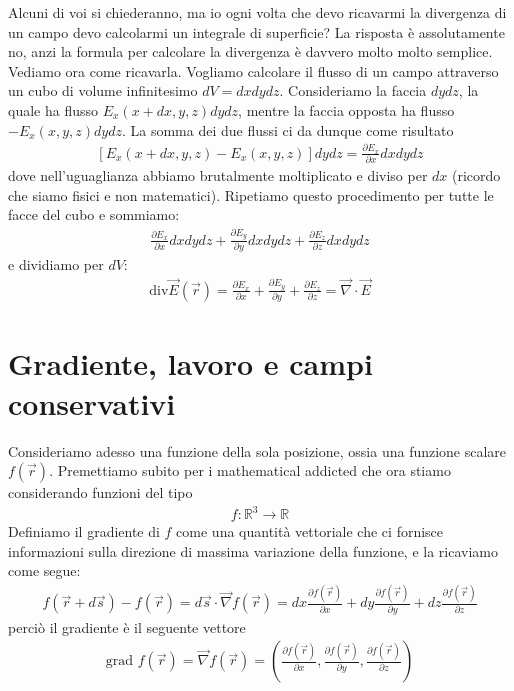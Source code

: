 \documentclass{book}
\begin{document}
Alcuni di voi si chiederanno, ma io ogni volta che devo ricavarmi la divergenza di un campo devo calcolarmi un integrale di superficie? La risposta è assolutamente no, anzi la formula per calcolare la divergenza è davvero molto molto semplice. Vediamo ora come ricavarla.
Vogliamo calcolare il flusso di un campo attraverso un cubo di volume infinitesimo $dV =dxdydz$.
Consideriamo la faccia $dydz$, la quale ha flusso $E_x(x+dx, y, z) dydz$, mentre la faccia opposta ha flusso $- E_x (x, y,z) dydz$. La somma dei due flussi ci da dunque come risultato 
\begin{align*}
    \left[ E_x(x+dx, y, z)- E_x(x,y,z)\right]dydz = \frac{\partial E_x}{\partial x} dx dy dz
\end{align*}
dove nell'uguaglianza abbiamo brutalmente moltiplicato e diviso per $dx$ (ricordo che siamo fisici e non matematici).
Ripetiamo questo procedimento per tutte le facce del cubo e sommiamo:
\begin{align*}
    \frac{\partial E_x}{\partial x}dxdydz+ \frac{\partial E_y}{\partial y}dxdydz + \frac{\partial E_z}{\partial z}dxdydz
\end{align*}
e dividiamo per $dV$:
\begin{align*}
\text{div} \vec{E}(\vec{r})= \frac{\partial E_x}{\partial x} + \frac{\partial E_y }{\partial y} + \frac{\partial E_z}{\partial z} = \vec{\nabla} \cdot \vec{E}
\end{align*}

\section{Gradiente, lavoro e campi conservativi}
Consideriamo adesso una funzione della sola posizione, ossia una funzione scalare $f(\vec{r})$. Premettiamo subito per i mathematical addicted che ora stiamo considerando funzioni del tipo 
\begin{align*}
    f: \mathbb{R}^3\to \mathbb{R}
\end{align*}
Definiamo il gradiente di $f$ come una quantità vettoriale che ci fornisce informazioni sulla direzione di massima variazione della funzione, e la ricaviamo come segue:
\begin{align*}
    f(\vec{r}+ d\vec{s}) - f(\vec{r}) = d\vec{s} \cdot \vec{\nabla }f (\vec{r}) = dx \frac{\partial f(\vec{r})}{\partial x}+ dy\frac{\partial f(\vec{r})}{\partial y}+ dz \frac{\partial f(\vec{r})}{\partial z}
\end{align*}
perciò il gradiente è il seguente vettore 
\begin{align*}
    \text{grad }f(\vec{r}) = \vec{\nabla}f(\vec{r}) = \left(\frac{\partial f(\vec{r})}{\partial x}, \frac{\partial f(\vec{r})}{\partial y}, \frac{\partial f(\vec{r})}{\partial z}\right)
\end{align*}
\end{document}
